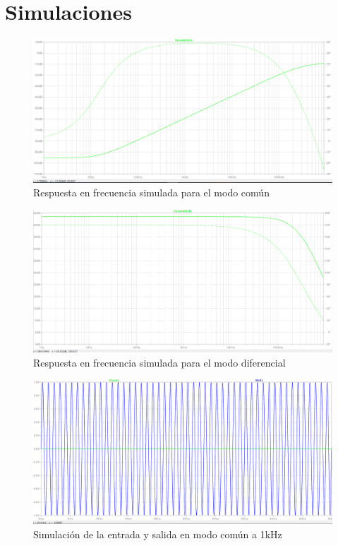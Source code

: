 \documentclass[../../tc_tp3_main.tex]{subfiles}
\begin{document}
\section{Simulaciones}

	\begin{figure}[h!]	
		\centering
		\includegraphics[scale=0.3]{imagenes/bode_comun_simulado.png}
		\caption{Respuesta en frecuencia simulada para el modo común}
		\label{fig:ej5_bode_diferencial_simulado}
	\end{figure}

	\begin{figure}[h!]	
		\centering
		\includegraphics[scale=0.3]{imagenes/bode_diferencial_simulado.png}
		\caption{Respuesta en frecuencia simulada para el modo diferencial}
		\label{fig:ej5_bode_diferencial_simulado}
	\end{figure}
	
	\begin{figure}[h!]	
		\centering
		\includegraphics[scale=0.4]{imagenes/ganancia_comun_simulado.png}
		\caption{Simulación de la entrada y salida en modo común a 1kHz}
		\label{fig:ej3_ganancia_comun_simulado}
	\end{figure}
	
\end{document}
